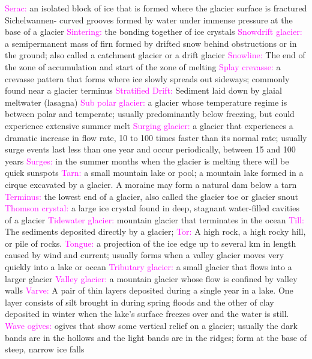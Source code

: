 \documentclass{article}
\newcommand{\pink}[1]{\textcolor{magenta}{#1}}
\newcommand{\vocab}[1]{{\pink{#1}}}
\begin{document}
\begin{multicols*}{4}
		\vocab{        Serac: } an isolated block of ice that is formed where the glacier surface is fractured 
		\vocab{ }        Sichelwannen- curved grooves formed by water under immense pressure at the base of a glacier  
		\vocab{        Sintering: } the bonding together of ice crystals 
		\vocab{        Snowdrift glacier: } a semipermanent mass of firn formed by drifted snow behind obstructions or in the ground; also called a catchment glacier or a drift glacier 
		\vocab{Snowline: } The end of the zone of accumulation and start of the zone of melting  
		\vocab{        Splay crevasse: } a crevasse pattern that forms where ice slowly spreads out sideways; commonly found near a glacier terminus 
		\vocab{Stratified Drift: } Sediment laid down by glaial meltwater (lasagna)  
		\vocab{        Sub polar glacier: } a glacier whose temperature regime is between polar and temperate; usually predominantly below freezing, but could experience extensive summer melt 
		\vocab{        Surging glacier: } a glacier that experiences a dramatic increase in flow rate, 10 to 100 times faster than its normal rate; usually surge events last less than one year and occur periodically, between 15 and 100 years 
		\vocab{Surges: } in the summer months when the glacier is melting there will be quick sunspots  
		\vocab{        Tarn: } a small mountain lake or pool; a mountain lake formed in a cirque excavated by a glacier. A moraine may form a natural dam below a tarn 
		\vocab{        Terminus: } the lowest end of a glacier, also called the glacier toe or glacier snout 
		\vocab{        Thomson crystal: } a large ice crystal found in deep, stagnant water-filled cavities of a glacier 
		\vocab{        Tidewater glacier: } mountain glacier that terminates in the ocean 
		\vocab{Till: } The sediments deposited directly by a glacier;  
		\vocab{Tor: } A high rock, a high rocky hill, or pile of rocks. 
		\vocab{        Tongue: } a projection of the ice edge up to several km in length caused by wind and current; usually forms when a valley glacier moves very quickly into a lake or ocean
		\vocab{        Tributary glacier: } a small glacier that flows into a larger glacier 
		\vocab{        Valley glacier: } a mountain glacier whose flow is confined by valley walls 
		\vocab{Varve: } A pair of thin layers deposited during a single year in a lake. One layer consists of silt brought in during spring floods and the other of clay deposited in winter when the lake's surface freezes over and the water is still.  
		\vocab{        Wave ogives: } ogives that show some vertical relief on a glacier; usually the dark bands are in the hollows and the light bands are in the ridges; form at the base of steep, narrow ice falls 

\end{multicols*}
\end{document}
